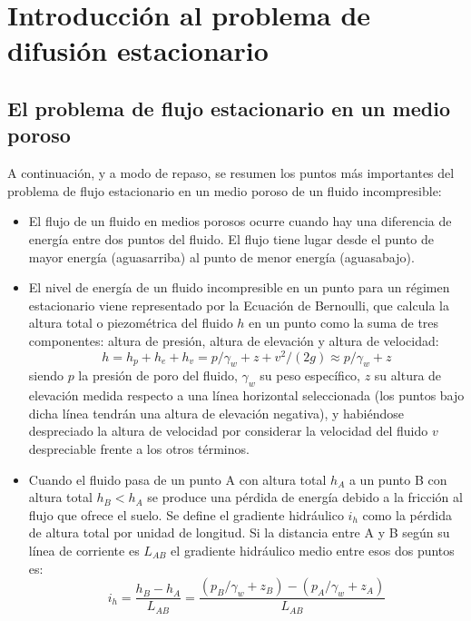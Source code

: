 \section{Introducción al problema de difusión estacionario}

\subsection{El problema de flujo estacionario en un medio poroso}

A continuación, y a modo de repaso, se resumen los puntos más
importantes del problema de flujo estacionario en un medio poroso de
un fluido incompresible:
\begin{itemize}
\item El flujo de un fluido en medios porosos ocurre cuando hay una
  diferencia de energía entre dos puntos del fluido. El flujo tiene
  lugar desde el punto de mayor energía (aguasarriba) al punto de
  menor energía (aguasabajo).
\item El nivel de energía de un fluido incompresible en un punto para
  un régimen estacionario viene representado por la Ecuación de
  Bernoulli, que calcula la altura total o piezométrica del fluido $h$
  en un punto como la suma de tres componentes: altura de presión,
  altura de elevación y altura de velocidad:
  \begin{equation}
    \label{eq:0101}
    h=h_p+h_e+h_v=p/\gamma_w+z+v^2/(2g)\approx p/\gamma_w+z
  \end{equation}
  siendo $p$ la presión de poro del fluido, $\gamma_w$ su peso
  específico, $z$ su altura de elevación medida respecto a una línea
  horizontal seleccionada (los puntos bajo dicha línea tendrán una
  altura de elevación negativa), y habiéndose despreciado la altura de
  velocidad por considerar la velocidad del fluido $v$ despreciable
  frente a los otros términos.
\item Cuando el fluido pasa de un punto A con altura total $h_A$ a un
  punto B con altura total $h_B<h_A$ se produce una pérdida de energía
  debido a la fricción al flujo que ofrece el suelo. Se define el
  gradiente hidráulico $i_h$ como la pérdida de altura total por
  unidad de longitud. Si la distancia entre A y B según su línea de
  corriente es $L_{AB}$ el gradiente hidráulico medio entre esos dos
  puntos es:
  \begin{equation}
    \label{eq:0102}
    i_h=\frac{h_B-h_A}{L_{AB}}=\frac{(p_B/\gamma_w+z_B)-(p_A/\gamma_w+z_A)}{L_{AB}}
  \end{equation}

\end{itemize}
